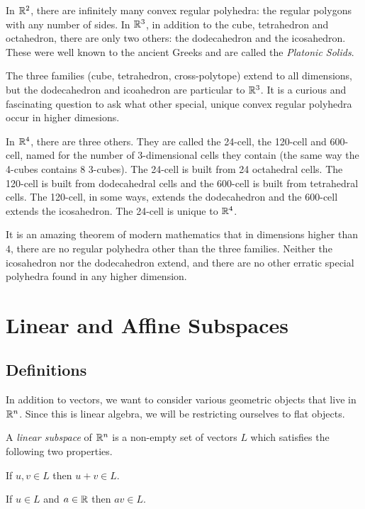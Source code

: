 \documentclass[fleqn]{report}
\begin{document}
In $\mathbb{R}^2$, there are infinitely many convex regular
polyhedra: the regular polygons with any number of sides. In
$\mathbb{R}^3$, in addition to the cube, tetrahedron and octahedron,
there are only two others: the dodecahedron and the
icosahedron. These were well known to the ancient Greeks and
are called the \emph{Platonic Solids}.

The three families (cube, tetrahedron, cross-polytope) extend
to all dimensions, but the dodecahedron and icoahedron are
particular to $\mathbb{R}^3$. It is a curious and fascinating
question to ask what other special, unique convex regular
polyhedra occur in higher dimesions.

In $\mathbb{R}^4$, there are three others. They are called the
24-cell, the 120-cell and 600-cell, named for the number of
3-dimensional cells they contain (the same way the
4-cubes contains 8 3-cubes). The 24-cell is built from 24
octahedral cells. The 120-cell is built from dodecahedral
cells and the 600-cell is built from tetrahedral cells. The
120-cell, in some ways, extends the dodecahedron and the
600-cell extends the icosahedron. The 24-cell is unique to
$\mathbb{R}^4$.

It is an amazing theorem of modern mathematics that in
dimensions higher than $4$, there are no regular polyhedra
other than the three families. Neither the icosahedron nor the
dodecahedron extend, and there are no other erratic special
polyhedra found in any higher dimension.

\chapter{Linear and Affine Subspaces}
\label{subspaces}

\section{Definitions}

In addition to vectors, we want to consider various geometric
objects that live in $\mathbb{R}^n$. Since this is linear algebra,
we will be restricting ourselves to flat objects. 

\begin{defn}
A \emph{linear subspace} of $\mathbb{R}^n$ is a non-empty set of
vectors $L$ which satisfies the following two properties.
\begin{smallitemize}
\item If $u,v \in L$ then $u+v \in L$.
\item If $u \in L$ and $a \in \mathbb{R}$ then $av \in L$.
\end{smallitemize}
\end{defn}
\end{document}
